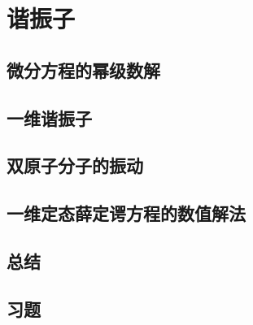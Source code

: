 \chapter{谐振子}
\label{chap:4}

\section{微分方程的幂级数解}
\label{sec:4.1 Power-Series Solutions of Differential Equations}


\section{一维谐振子}
\label{sec:4.2 The}

\section{双原子分子的振动}
\label{sec:4.3 Vibrations of Diatomic Molecules}

\section{一维定态薛定谔方程的数值解法}
\label{sec:4.4 Numerical Solutions of the One-Dimensional Time-Independent Schrödinger Equation}

\section*{总结}

\section*{习题}
